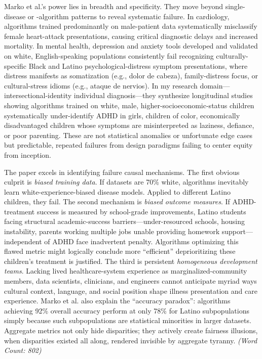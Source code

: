 \documentclass[11pt,twoside]{article}
\begin{document}
Marko et al.'s power lies in breadth and specificity. They move beyond single-disease or -algorithm patterns to reveal systematic failure. In cardiology, algorithms trained predominantly on male-patient data systematically misclassify female heart-attack presentations, causing critical diagnostic delays and increased mortality. In mental health, depression and anxiety tools developed and validated on white, English-speaking populations consistently fail recognizing culturally-specific Black and Latino psychological-distress symptom presentations, where distress manifests as somatization (e.g., dolor de cabeza), family-distress focus, or cultural-stress idioms (e.g., ataque de nervios). In my research domain---intersectional-identity individual diagnosis---they synthesize longitudinal studies showing algorithms trained on white, male, higher-socioeconomic-status children systematically under-identify ADHD in girls, children of color, economically disadvantaged children whose symptoms are misinterpreted as laziness, defiance, or poor parenting. These are not statistical anomalies or unfortunate edge cases but predictable, repeated failures from design paradigms failing to center equity from inception.

The paper excels in identifying failure causal mechanisms. The first obvious culprit is \textit{biased training data}. If datasets are 70\% white, algorithms inevitably learn white-experience-biased disease models. Applied to different Latino children, they fail. The second mechanism is \textit{biased outcome measures}. If ADHD-treatment success is measured by school-grade improvements, Latino students facing structural academic-success barriers---under-resourced schools, housing instability, parents working multiple jobs unable providing homework support---independent of ADHD face inadvertent penalty. Algorithms optimizing this flawed metric might logically conclude more ``efficient'' deprioritizing these children's treatment is justified. The third is persistent \textit{homogeneous development teams}. Lacking lived healthcare-system experience as marginalized-community members, data scientists, clinicians, and engineers cannot anticipate myriad ways cultural context, language, and social position shape illness presentation and care experience. Marko et al. also explain the ``accuracy paradox'': algorithms achieving 92\% overall accuracy perform at only 78\% for Latino subpopulations simply because such subpopulations are statistical minorities in larger datasets. Aggregate metrics not only hide disparities; they actively create fairness illusions, when disparities existed all along, rendered invisible by aggregate tyranny. \textit{(Word Count: 802)}
\end{document}
